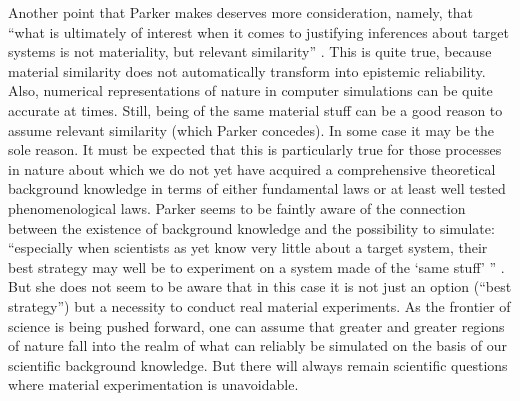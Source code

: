 \documentclass[12pt, a4paper]{article}
\numberwithin{equation}{section}
\begin{document}
Another point that Parker makes deserves more consideration, namely, that  ``what is ultimately of interest when it comes to justifying inferences about target systems is not materiality, but relevant similarity'' \cite[p.\ 493]{parker:2009}. This is quite true, because material similarity does not automatically transform into epistemic reliability. Also, numerical representations of nature in computer simulations can be quite accurate at times. Still, being of the same material stuff can be a good reason to assume relevant similarity (which Parker concedes). In some case it may be the sole reason. It must be expected that this is particularly true for those processes in nature about which we do not yet have acquired a comprehensive theoretical background knowledge in terms of either fundamental laws or at least well tested phenomenological laws. Parker seems to be faintly aware of the connection between the existence of background knowledge and the possibility to simulate: ``especially when scientists as yet know very little about a target system, their best strategy may well be to experiment on a system made of the `same stuff' '' \citep[p.\ 494]{parker:2009}. But she does not seem to be aware that in this case it is not just an option (``best strategy'') but a necessity to conduct real material experiments. As the frontier of science is being pushed forward, one can assume that greater and greater regions of nature fall into the realm of what can reliably be simulated on the basis of our scientific background knowledge. But there will always remain scientific questions where material experimentation is unavoidable.
\end{document}
